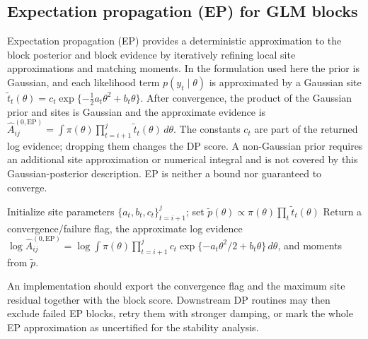 \subsection{Expectation propagation (EP) for GLM blocks}
Expectation propagation (EP) \citep{minka2001ep} provides a deterministic approximation to the
block posterior and block evidence by iteratively refining local site approximations and matching
moments. In the formulation used here the prior is Gaussian, and each likelihood term
$p(y_t\mid\theta)$ is approximated by a Gaussian site
$\tilde t_t(\theta)=c_t\exp\{-\tfrac{1}{2}a_t\theta^2+b_t\theta\}$. After convergence, the product
of the Gaussian prior and sites is Gaussian and the approximate evidence is
$\widehat A^{(0,\mathrm{EP})}_{ij}=\int \pi(\theta)\prod_{t=i+1}^j \tilde t_t(\theta)\,d\theta$.
The constants $c_t$ are part of the returned log evidence; dropping them changes the DP score.
A non-Gaussian prior requires an additional site approximation or numerical integral and is not
covered by this Gaussian-posterior description. EP is neither a bound nor guaranteed to converge.

\begin{algorithm}[H]
\caption{GLMBlock\_EP$(y,w,i,j,\texttt{prior})$}
\label{alg:ep}
Initialize site parameters $\{a_t,b_t,c_t\}_{t=i+1}^j$; set $\tilde p(\theta)\propto\pi(\theta)\prod_t \tilde t_t(\theta)$\;
Return a convergence/failure flag, the approximate log evidence
$\log\widehat A^{(0,\mathrm{EP})}_{ij}=\log\int \pi(\theta)\prod_{t=i+1}^j c_t\exp\{-a_t\theta^2/2+b_t\theta\}\,d\theta$, and moments from $\tilde p$.
\end{algorithm}

An implementation should export the convergence flag and the maximum site residual together with the
block score. Downstream DP routines may then exclude failed EP blocks, retry them with stronger
damping, or mark the whole EP approximation as uncertified for the stability analysis.


